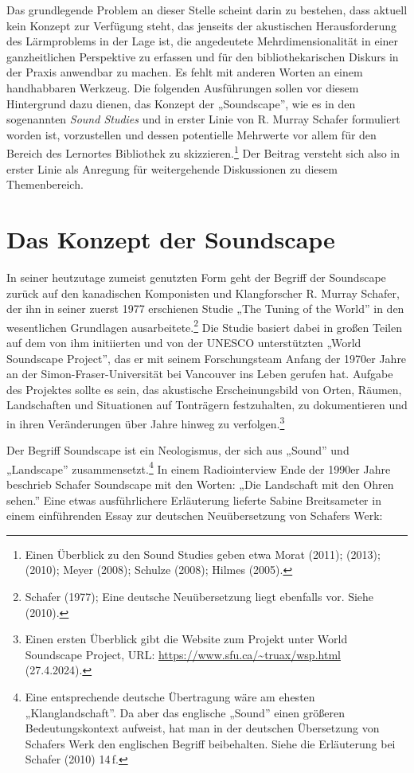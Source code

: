 \documentclass[a4paper,
fontsize=11pt,
oneside,
numbers=noperiodatend,
parskip=half-,
bibliography=totoc,
final
]{scrartcl}
\begin{document}
Das grundlegende Problem an dieser Stelle scheint darin zu bestehen,
dass aktuell kein Konzept zur Verfügung steht, das jenseits der
akustischen Herausforderung des Lärmproblems in der Lage ist, die
angedeutete Mehrdimensionalität in einer ganzheitlichen Perspektive zu
erfassen und für den bibliothekarischen Diskurs in der Praxis anwendbar
zu machen. Es fehlt mit anderen Worten an einem handhabbaren Werkzeug.
Die folgenden Ausführungen sollen vor diesem Hintergrund dazu dienen,
das Konzept der „Soundscape'', wie es in den sogenannten \emph{Sound
Studies} und in erster Linie von R. Murray Schafer formuliert worden
ist, vorzustellen und dessen potentielle Mehrwerte vor allem für den
Bereich des Lernortes Bibliothek zu skizzieren.\footnote{Einen Überblick
  zu den Sound Studies geben etwa Morat (2011); (2013); (2010); Meyer
  (2008); Schulze (2008); Hilmes (2005).} Der Beitrag versteht sich also
in erster Linie als Anregung für weitergehende Diskussionen zu diesem
Themenbereich.

\hypertarget{das-konzept-der-soundscape}{%
\section{Das Konzept der Soundscape}\label{das-konzept-der-soundscape}}

In seiner heutzutage zumeist genutzten Form geht der Begriff der
Soundscape zurück auf den kanadischen Komponisten und Klangforscher R.
Murray Schafer, der ihn in seiner zuerst 1977 erschienen Studie „The
Tuning of the World'' in den wesentlichen Grundlagen
ausarbeitete.\footnote{Schafer (1977); Eine deutsche Neuübersetzung
  liegt ebenfalls vor. Siehe (2010).} Die Studie basiert dabei in großen
Teilen auf dem von ihm initiierten und von der UNESCO unterstützten
„World Soundscape Project'', das er mit seinem Forschungsteam Anfang der
1970er Jahre an der Simon-Fraser-Universität bei Vancouver ins Leben
gerufen hat. Aufgabe des Projektes sollte es sein, das akustische
Erscheinungsbild von Orten, Räumen, Landschaften und Situationen auf
Tonträgern festzuhalten, zu dokumentieren und in ihren Veränderungen
über Jahre hinweg zu verfolgen.\footnote{Einen ersten Überblick gibt die
  Website zum Projekt unter World Soundscape Project, URL:
  \url{https://www.sfu.ca/~truax/wsp.html} (27.4.2024).}

Der Begriff Soundscape ist ein Neologismus, der sich aus „Sound'' und
„Landscape'' zusammensetzt.\footnote{Eine entsprechende deutsche
  Übertragung wäre am ehesten „Klanglandschaft''. Da aber das englische
  „Sound'' einen größeren Bedeutungskontext aufweist, hat man in der
  deutschen Übersetzung von Schafers Werk den englischen Begriff
  beibehalten. Siehe die Erläuterung bei Schafer (2010) 14\,f.} In einem
Radiointerview Ende der 1990er Jahre beschrieb Schafer Soundscape mit
den Worten: „Die Landschaft mit den Ohren sehen.'' Eine etwas
ausführlichere Erläuterung lieferte Sabine Breitsameter in einem
einführenden Essay zur deutschen Neuübersetzung von Schafers Werk:
\end{document}
